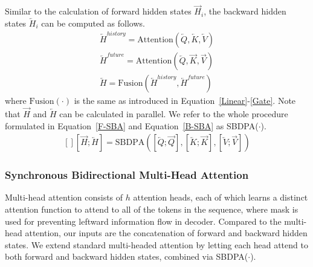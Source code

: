 \documentclass[11pt,a4paper]{article}
\begin{document}
\begin{CJK*}{UTF8}{gbsn}
Similar to the calculation of forward hidden states $\overrightarrow{H}_{i}$, the backward hidden states $\overleftarrow{H}_{i}$ can be computed as follows.
\begin{equation}\label{B-SBA}
\begin{aligned}
  \overleftarrow{H}^{history} = \mbox{Attention}(\overleftarrow{Q}, \overleftarrow{K}, \overleftarrow{V}) \\
  \overleftarrow{H}^{future} = \mbox{Attention}(\overleftarrow{Q}, \overrightarrow{K}, \overrightarrow{V}) \\
  \overleftarrow{H} = \mbox{Fusion}(\overleftarrow{H}^{history}, \overleftarrow{H}^{future})
\end{aligned}
\end{equation}
where $\mbox{Fusion} (\cdot)$ is the same as introduced in Equation~\ref{Linear}-\ref{Gate}. Note that $\overrightarrow{H}$ and $\overleftarrow{H}$ can be calculated in parallel.
We refer to the whole procedure formulated in Equation~\ref{F-SBA} and Equation~\ref{B-SBA} as SBDPA($\cdot$).
\begin{equation}\label{SBAtt}
\begin{aligned}
  [][ \overrightarrow{H};\overleftarrow{H}] = \mbox{SBDPA}([\overleftarrow{Q};\overrightarrow{Q}],[\overleftarrow{K};\overrightarrow{K}], [\overleftarrow{V};\overrightarrow{V}])
\end{aligned}
\end{equation}

\subsubsection{Synchronous Bidirectional Multi-Head Attention} \label{SBMHA-sec}
Multi-head attention consists of $h$ attention heads, each of which learns a distinct attention function to attend to all of the tokens in the sequence, where mask is used for preventing leftward information flow in decoder.
Compared to the multi-head attention, our inputs are the concatenation of forward and backward hidden states.
We extend standard multi-headed attention by letting each head attend to both forward and backward hidden states, combined via SBDPA($\cdot$).


\end{CJK*}
\end{document}

